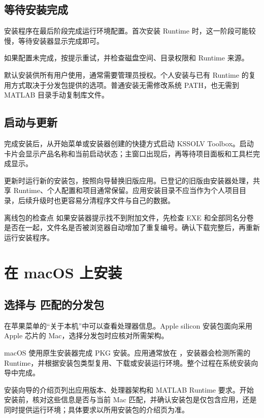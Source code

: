 \subsection{等待安装完成}

安装程序在最后阶段完成运行环境配置。首次安装 Runtime 时，这一阶段可能较慢，等待安装器显示完成即可。

如果配置未完成，按提示重试，并检查磁盘空间、目录权限和 Runtime 来源。

默认安装供所有用户使用，通常需要管理员授权。个人安装与已有 Runtime 的复用方式取决于分发包提供的选项。普通安装无需修改系统 PATH，也无需到 MATLAB\regmark{} 目录手动复制库文件。

\subsection{启动与更新}

完成安装后，从开始菜单或安装器创建的快捷方式启动 KSSOLV Toolbox。启动卡片会显示产品名称和当前启动状态；主窗口出现后，再等待项目面板和工具栏完成显示。

更新时运行新的安装包，按照向导替换旧版应用。已登记的旧版由安装器处理，共享 Runtime、个人配置和项目通常保留。应用安装目录不应当作为个人项目目录，后续升级时也更容易分清程序文件与自己的数据。

\begin{notebox}{离线包的检查点}
如果安装器提示找不到附加文件，先检查 EXE 和全部同名分卷是否在一起，文件名是否被浏览器自动增加了重复编号。确认下载完整后，再重新运行安装程序。
\end{notebox}

\section{在 macOS 上安装}

\subsection{选择与  匹配的分发包}

在苹果菜单的“关于本机”中可以查看处理器信息。Apple silicon 安装包面向采用 Apple 芯片的 Mac，选择分发包时应核对所需架构。

macOS 使用原生安装器完成 PKG 安装。应用通常放在 ，安装器会检测所需的 Runtime，并根据安装包类型复用、下载或安装运行环境。整个过程在系统安装向导中完成。

安装向导的介绍页列出应用版本、处理器架构和 MATLAB\regmark{} Runtime 要求。开始安装前，核对这些信息是否与当前 Mac 匹配，并确认安装包是仅包含应用，还是同时提供运行环境；具体要求以所用安装包的介绍页为准。

